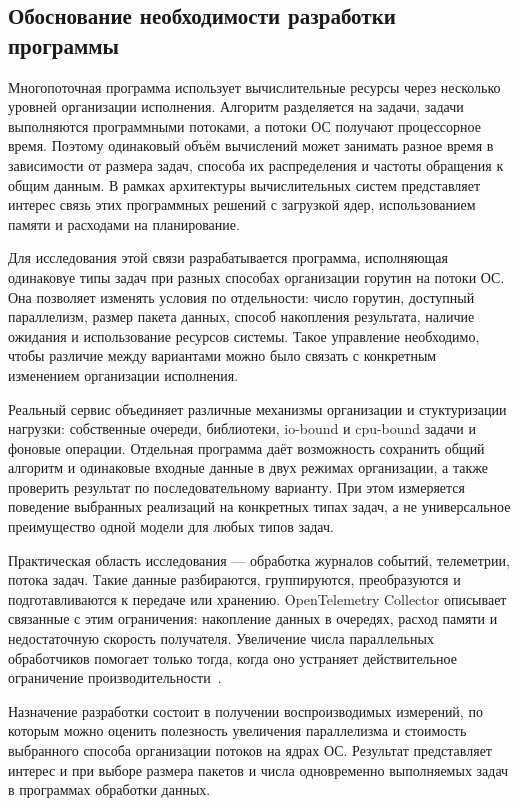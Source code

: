 \subsection{Обоснование необходимости разработки программы}
\label{subsec:development-rationale}

Многопоточная программа использует вычислительные ресурсы через несколько уровней организации
  исполнения. Алгоритм разделяется на задачи, задачи выполняются программными потоками, а потоки ОС
  получают процессорное время. Поэтому одинаковый объём вычислений может занимать разное время
  в зависимости от размера задач, способа их распределения и частоты обращения к общим данным.
  В рамках архитектуры вычислительных систем представляет интерес связь этих программных решений
  с загрузкой ядер, использованием памяти и расходами на планирование.

Для исследования этой связи разрабатывается программа, исполняющая одинаковуе типы задач
  при разных способах организации горутин на потоки ОС. Она позволяет изменять условия по отдельности:
  число горутин, доступный параллелизм, размер пакета данных, способ накопления результата, наличие
  ожидания и использование ресурсов системы. Такое управление необходимо, чтобы различие между вариантами можно было связать
  с конкретным изменением организации исполнения.

Реальный сервис объединяет различные механизмы организации и стуктуризации нагрузки: собственные очереди, библиотеки,
  io-bound и cpu-bound задачи и фоновые операции. Отдельная программа даёт возможность сохранить
  общий алгоритм и одинаковые входные данные в двух режимах организации, а также проверить результат по
  последовательному варианту. При этом измеряется поведение выбранных реализаций на конкретных типах задач, а не универсальное
  преимущество одной модели для любых типов задач.

Практическая область исследования — обработка журналов событий, телеметрии, потока задач. Такие данные
  разбираются, группируются, преобразуются и подготавливаются к передаче или хранению.
  OpenTelemetry Collector описывает связанные с этим ограничения: накопление данных в очередях,
  расход памяти и недостаточную скорость получателя. Увеличение числа параллельных обработчиков
  помогает только тогда, когда оно устраняет действительное ограничение
  производительности~\cite{otel_collector_scaling}.

Назначение разработки состоит в получении воспроизводимых измерений, по которым можно оценить
  полезность увеличения параллелизма и стоимость выбранного способа организации потоков на ядрах ОС.
  Результат представляет интерес и при выборе размера пакетов и числа одновременно выполняемых
  задач в программах обработки данных.

